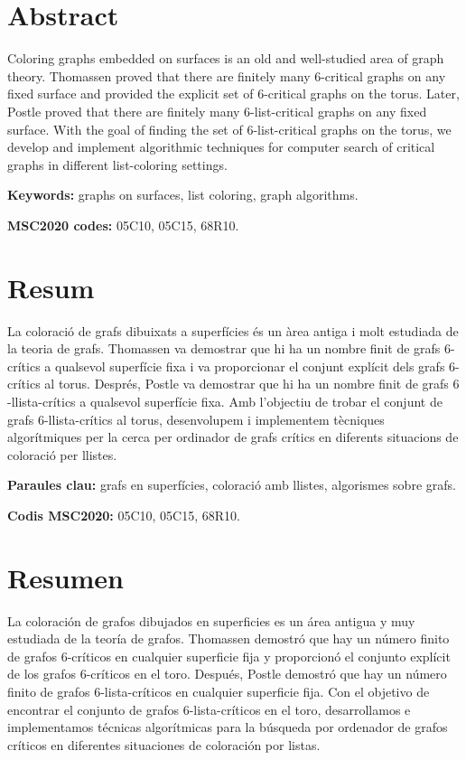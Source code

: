 \documentclass{report}
\theoremstyle{definition}
\begin{document}
\listoftodos

\newpage

\section*{Abstract}

Coloring graphs embedded on surfaces is an old and well-studied area of graph theory. Thomassen proved that there are finitely many $6$-critical graphs on any fixed surface and provided the explicit set of $6$-critical graphs on the torus. Later, Postle proved that there are finitely many $6$-list-critical graphs on any fixed surface. With the goal of finding the set of $6$-list-critical graphs on the torus, we develop and implement algorithmic techniques for computer search of critical graphs in different list-coloring settings. 

\textbf{Keywords:} graphs on surfaces, list coloring, graph algorithms.

\textbf{MSC2020 codes:} 05C10, 05C15, 68R10.

\section*{Resum}

La coloració de grafs dibuixats a superfícies és un àrea antiga i molt estudiada de la teoria de grafs. Thomassen va demostrar que hi ha un nombre finit de grafs $6$-crítics a qualsevol superfície fixa i va proporcionar el conjunt explícit dels grafs $6$-crítics al torus. Després, Postle va demostrar que hi ha un nombre finit de grafs $6$-llista-crítics a qualsevol superfície fixa. Amb l'objectiu de trobar el conjunt de grafs $6$-llista-crítics al torus, desenvolupem i implementem tècniques algorítmiques per la cerca per ordinador de grafs crítics en diferents situacions de coloració per llistes.  

\textbf{Paraules clau:} grafs en superfícies, coloració amb llistes, algorismes sobre grafs.

\textbf{Codis MSC2020:} 05C10, 05C15, 68R10.


\section*{Resumen}

La coloración de grafos dibujados en superficies es un área antigua y muy estudiada de la teoría de grafos. Thomassen demostró que hay un número finito de grafos $6$-críticos en cualquier superficie fija y proporcionó el conjunto explícit de los grafos $6$-críticos en el toro. Después, Postle demostró que hay un número finito de grafos 6-lista-críticos en cualquier superficie fija. Con el objetivo de encontrar el conjunto de grafos $6$-lista-críticos en el toro, desarrollamos e implementamos técnicas algorítmicas para la búsqueda por ordenador de grafos críticos en diferentes situaciones de coloración por listas.
\end{document}
